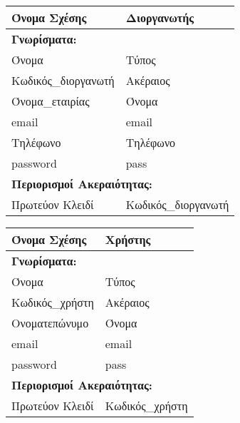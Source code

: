 \begin{tabular}{|p{6cm}|p{8cm}|}
  \hline
  Όνομα Σχέσης             & Διοργανωτής                   \\ \hline
  \multicolumn{2}{|l|}{\textbf{Γνωρίσματα:}}               \\ \hline
  Όνομα                    & Τύπος                         \\ \hline
  Κωδικός\_διοργανωτή       & Ακέραιος                      \\ \hline
  Όνομα\_εταιρίας           & Όνομα                         \\ \hline
  email                    & email                         \\ \hline
  Τηλέφωνο                 & Τηλέφωνο                      \\ \hline
  password                 & pass                          \\ \hline
  \multicolumn{2}{|l|}{\textbf{Περιορισμοί Ακεραιότητας:}} \\ \hline
  Πρωτεύον Κλειδί          & Κωδικός\_διοργανωτή            \\ \hline
\end{tabular}


\begin{tabular}{|p{6cm}|p{8cm}|}
  \hline
  Όνομα Σχέσης    & Χρήστης                                \\ \hline
  \multicolumn{2}{|l|}{\textbf{Γνωρίσματα:}}               \\ \hline
  Όνομα           & Τύπος                                  \\ \hline
  Κωδικός\_χρήστη  & Ακέραιος                               \\ \hline
  Ονοματεπώνυμο   & Όνομα                                  \\ \hline
  email           & email                                  \\ \hline
  password        & pass                                   \\ \hline
  \multicolumn{2}{|l|}{\textbf{Περιορισμοί Ακεραιότητας:}} \\ \hline
  Πρωτεύον Κλειδί & Κωδικός\_χρήστη                         \\ \hline
\end{tabular}


